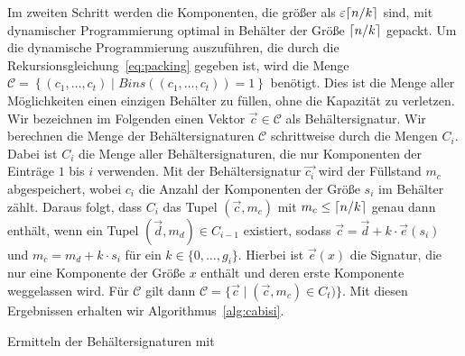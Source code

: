Im zweiten Schritt werden die Komponenten, die größer als $\varepsilon \lceil n/k\rceil$ sind, mit dynamischer Programmierung optimal in Behälter der Größe $\lceil n/k\rceil$ gepackt.
Um die dynamische Programmierung auszuführen, die durch die Rekursionsgleichung~\eqref{eq:packing} gegeben ist, wird die Menge $\mathcal{C} = \left\{ (c_1, \ldots, c_t) \mid Bins((c_1, \ldots, c_t)) = 1 \right\}$ benötigt.
Dies ist die Menge aller Möglichkeiten einen einzigen Behälter zu füllen, ohne die Kapazität zu verletzen.
Wir bezeichnen im Folgenden einen Vektor $\vec{c} \in \mathcal{C}$ als Behältersignatur.
Wir berechnen die Menge der Behältersignaturen $\mathcal{C}$ schrittweise durch die Mengen $C_i$.
Dabei ist $C_i$ die Menge aller Behältersignaturen, die nur Komponenten der Einträge $1$ bis $i$ verwenden.
Mit der Behältersignatur $\vec{c_i}$ wird der Füllstand $m_c$ abgespeichert, wobei $c_i$ die Anzahl der Komponenten der Größe $s_i$ im Behälter zählt.
Daraus folgt, dass $C_i$ das Tupel $(\vec{c}, m_c)$ mit $m_c \leq \lceil n/k\rceil$ genau dann enthält, wenn ein Tupel $(\vec{d}, m_d) \in C_{i-1}$ existiert, sodass $\vec{c} = \vec{d} + k \cdot \vec{e}(s_i)$ und $m_c = m_d + k \cdot s_i$ für ein $k \in \{0, \ldots, g_i\}$.
Hierbei ist $\vec{e}(x)$ die Signatur, die nur eine Komponente der Größe $x$ enthält und deren erste Komponente weggelassen wird.
Für $\mathcal{C}$ gilt dann $\mathcal{C} = \{ \vec{c} \mid (\vec{c}, m_c) \in C_t)\}$.
Mit diesen Ergebnissen erhalten wir Algorithmus~\ref{alg:cabisi}.

\begin{algorithm}
    \caption{Ermitteln der Behältersignaturen mit }
    \label{alg:cabisi}
    \begin{algorithmic}[1]
                 
                       \EndIf
                    \EndFor
                \EndFor
            \EndFor
        \EndFunction
    \end{algorithmic}
\end{algorithm}

